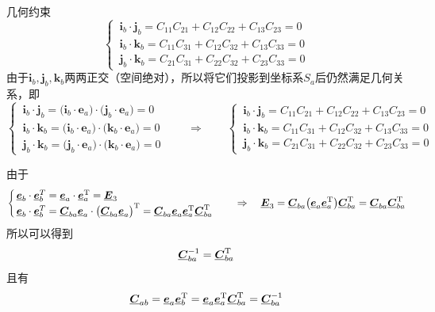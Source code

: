 \noa[2] 几何约束
\begin{equation}
	\begin{cases}
		\,\bm{i}_b \cdot \bm{j}_b = C_{11}C_{21} + C_{12}C_{22} + C_{13}C_{23} = 0 \\
		\,\bm{i}_b \cdot \bm{k}_b = C_{11}C_{31} + C_{12}C_{32} + C_{13}C_{33} = 0 \\
		\,\bm{j}_b \cdot \bm{k}_b = C_{21}C_{31} + C_{22}C_{32} + C_{23}C_{33} = 0
	\end{cases}
\end{equation}
\proof 由于$\bm{i}_b, \bm{j}_b, \bm{k}_b$两两正交（空间绝对），所以将它们投影到坐标系$S_a$后仍然满足几何关系，即
\begin{equation*}
	\begin{cases}
		\,\bm{i}_b \cdot \bm{j}_b = \big(\bm{i}_b \cdot \bm{e}_a\big) \cdot  \big(\bm{j}_b \cdot \bm{e}_a\big) = 0\\
		\,\bm{i}_b \cdot \bm{k}_b = \big(\bm{i}_b \cdot \bm{e}_a\big) \cdot \big(\bm{k}_b \cdot \bm{e}_a\big) = 0\\
		\,\bm{j}_b \cdot \bm{k}_b =\big(\bm{j}_b \cdot \bm{e}_a\big) \cdot \big(\bm{k}_b \cdot \bm{e}_a\big) = 0
	\end{cases}
	\qquad \Longrightarrow \qquad 
	\begin{cases}
		\,\bm{i}_b \cdot \bm{j}_b = C_{11}C_{21} + C_{12}C_{22} + C_{13}C_{23} = 0 \\
		\,\bm{i}_b \cdot \bm{k}_b = C_{11}C_{31} + C_{12}C_{32} + C_{13}C_{33} = 0 \\
		\,\bm{j}_b \cdot \bm{k}_b = C_{21}C_{31} + C_{22}C_{32} + C_{23}C_{33} = 0
	\end{cases}
\end{equation*}


\sssection[坐标变换矩阵是正交矩阵]

由于
\begin{equation*}
	\begin{cases}
		\,\underline{\bm{e}}_b \cdot \underline{\bm{e}}_b^T = \underline{\bm{e}}_a \cdot \underline{\bm{e}}_a^{\text{T}} = \underline{\bm{E}}_3\\
		\,\underline{\bm{e}}_b  \cdot \underline{\bm{e}}_b^T = \underline{\bm{C}}_{ba}\underline{\bm{e}}_a \cdot \big( \underline{\bm{C}}_{ba} \underline{\bm{e}}_a \big)^{\text{T}} =  \underline{\bm{C}}_{ba}\underline{\bm{e}}_a  \underline{\bm{e}}_a^{\text{T}} \underline{\bm{C}}_{ba}^{\text{T}}
	\end{cases}
	\quad \Rightarrow \quad \underline{\bm{E}}_3 = \underline{\bm{C}}_{ba} \big( \underline{\bm{e}}_a \underline{\bm{e}}_a^{\text{T}} \big) \underline{\bm{C}}_{ba}^{\text{T}} =  \underline{\bm{C}}_{ba} \underline{\bm{C}}_{ba}^{\text{T}}
\end{equation*}
所以可以得到
\begin{equation}
	\underline{\bm{C}}_{ba}^{-1} = \underline{\bm{C}}_{ba}^{\text{T}}
\end{equation}
且有
\begin{equation}
	\underline{\bm{C}}_{ab} = \underline{\bm{e}}_a \underline{\bm{e}}_b^{\text{T}} = \underline{\bm{e}}_a \underline{\bm{e}}_a^{\text{T}} \underline{\bm{C}}_{ba}^{\text{T}} = \underline{\bm{C}}_{ba}^{-1}
\end{equation}


